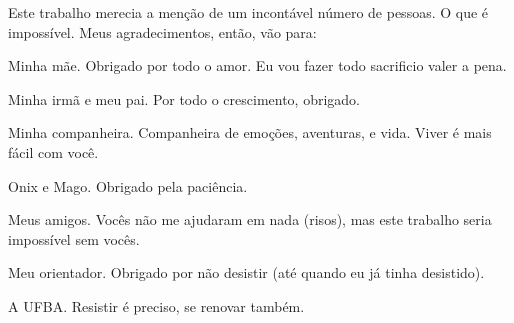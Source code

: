 \begin{agradecimentos}
    Este trabalho merecia a menção de um incontável número de pessoas. O que é impossível. Meus agradecimentos, então, vão para:
    
    Minha mãe. Obrigado por todo o amor. Eu vou fazer todo sacrificio valer a pena.
    
    Minha irmã e meu pai. Por todo o crescimento, obrigado.
    
    Minha companheira. Companheira de emoções, aventuras, e vida. Viver é mais fácil com você.
    
    Onix e Mago. Obrigado pela paciência.
    
    Meus amigos. Vocês não me ajudaram em nada (risos), mas este trabalho seria impossível sem vocês.
    
    Meu orientador. Obrigado por não desistir (até quando eu já tinha desistido).
    
    A UFBA. Resistir é preciso, se renovar também.

\end{agradecimentos}
